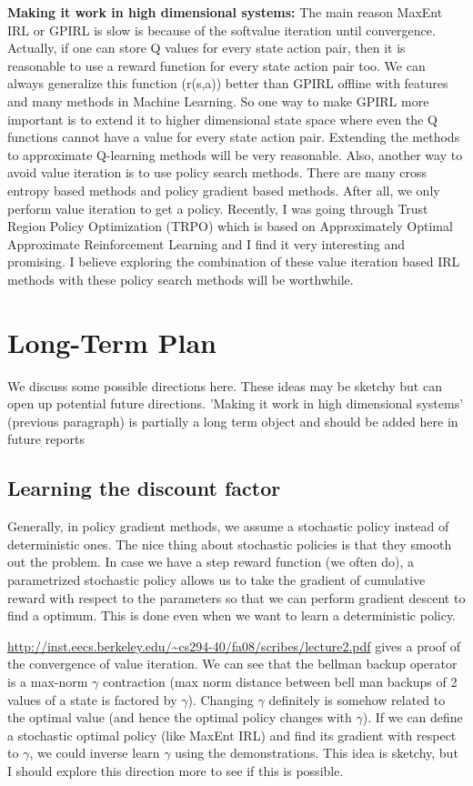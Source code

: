 \documentclass{article}[11pt]
\begin{document}
\textbf{Making it work in high dimensional systems:} The main reason MaxEnt IRL or GPIRL is slow is because of the softvalue iteration until convergence. Actually, if one can store Q values for every state action pair, then it is reasonable to use a reward function for every state action pair too. We can always generalize this function (r(s,a)) better than GPIRL offline with features and many methods in Machine Learning. So one way to make GPIRL more important is to extend it to higher dimensional state space where even the Q functions cannot have a value for every state action pair. Extending the methods to approximate Q-learning methods will be very reasonable. Also, another way to avoid value iteration is to use policy search methods. There are many cross entropy based methods and policy gradient based methods. After all, we only perform value iteration to get a policy. Recently, I was going through Trust Region Policy Optimization (TRPO) \cite{schulman2015trust} which is based on Approximately Optimal Approximate Reinforcement Learning \cite{kakade2002approximately} and I find it very interesting and promising. I believe exploring the combination of these value iteration based IRL methods with these policy search methods will be worthwhile. 

\section{Long-Term Plan}
We discuss some possible directions here. These ideas may be sketchy but can open up potential future directions. 'Making it work in high dimensional systems' (previous paragraph) is partially a long term object and should be added here in future reports
\subsection{Learning the discount factor}
Generally, in policy gradient methods, we assume a stochastic policy instead of deterministic ones. The nice thing about stochastic policies is that they smooth out the problem. In case we have a step reward function (we often do), a parametrized stochastic policy allows us to take the gradient of cumulative reward with respect to the parameters so that we can perform gradient descent to find a optimum. This is done even when we want to learn a deterministic policy. 

 \url{http://inst.eecs.berkeley.edu/~cs294-40/fa08/scribes/lecture2.pdf} gives a proof of the convergence of value iteration. We can see that the bellman backup operator is a max-norm $\gamma$ contraction (max norm distance between bell man backups of 2 values of a state is factored by $\gamma$). Changing $\gamma$ definitely is somehow related to the optimal value (and hence the optimal policy changes with $\gamma$). If we can define a stochastic optimal policy (like MaxEnt IRL) and find its gradient with respect to $\gamma$, we could inverse learn $\gamma$ using the demonstrations. This idea is sketchy, but I should explore this direction more to see if this is possible.
 
\end{document}
